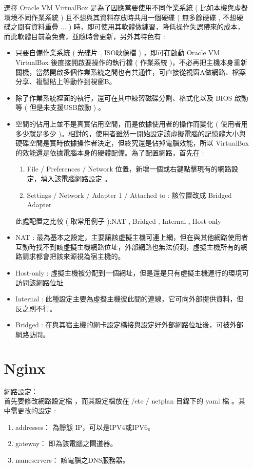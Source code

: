 \documentclass[14pt,a4paper]{report}  %
\begin{document}
 選擇 Oracle VM VirtualBox    是為了因應當要使用不同作業系統 ( 比如本機與虛擬環境不同作業系統  ) 且不想與其資料存放時共用一個硬碟 ( 無多餘硬碟 , 不想硬碟之間有資料重疊 ... ) 時，即可使用其軟體做練習，降低操作失誤帶來的成本，而此軟體目前為免費，並隨時會更新，另外其特色有 :\\  
\begin{itemize}


\item 只要自備作業系統 ( 光碟片 , ISO映像檔 ) ，即可在啟動 Oracle VM VirtualBox  後直接開啟要操作的執行檔 ( 作業系統 )，不必再把主機本身重新關機，當然開啟多個作業系統之間也有共通性，可直接從視窗A做網路、檔案分享、複製貼上等動作到視窗B。\\
\item 除了作業系統裡面的執行，還可在其中練習磁碟分割、格式化以及 BIOS 啟動等 ( 但是未支援USB啟動 ) 。\\
\item 空間的佔用上並不是真實佔用空間，而是依據使用者的操作而變化 ( 使用者用多少就是多少 )。相對的，使用者雖然一開始設定該虛擬電腦的記憶體大小與硬碟空間是實時依據操作者決定，但終究還是佔掉電腦效能，所以 VirtualBox 的效能還是依據電腦本身的硬體配備。為了配置網路，首先在 : \\
\begin{enumerate}
\item File / Preferences / Network  位置，新增一個或右鍵點擊現有的網路設定，填入該電腦網路設定 。
\item Settings / Network / Adapter 1 / Attached to :  該位置改成  Bridged Adapter
\end{enumerate}
\qquad 此處配置之比較 ( 取常用例子 ):NAT , Bridged , Internal , Host-only
\item NAT : 最為基本之設定，主要讓該虛擬主機可連上網，但在與其他網路使用者互動時找不到該虛擬主機網路位址，外部網路也無法偵測，虛擬主機所有的網路請求都會把該來源視為宿主機的。
\item Host-only : 虛擬主機被分配到一個網址，但是還是只有虛擬主機運行的環境可訪問該網路位址
\item Internal : 此種設定主要為虛擬主機彼此間的連線，它可向外部提供資料，但反之則不行。
\item Bridged : 在與其宿主機的網卡設定橋接與設定好外部網路位址後，可被外部網路訪問。
\end{itemize}
\newpage
\section{Nginx}
 網路設定：\\
 首先要修改網路設定檔 ，而其設定檔放在 /etc / netplan 目錄下的 yaml 檔 。其中需更改的設定 :
\begin{enumerate}
\item addresses： 為靜態 IP，可以是IPV4或IPV6。
\item gateway： 即為該電腦之閘道器。
\item nameservers： 該電腦之DNS服務器。
\end{enumerate}
\newpage
\end{document}

